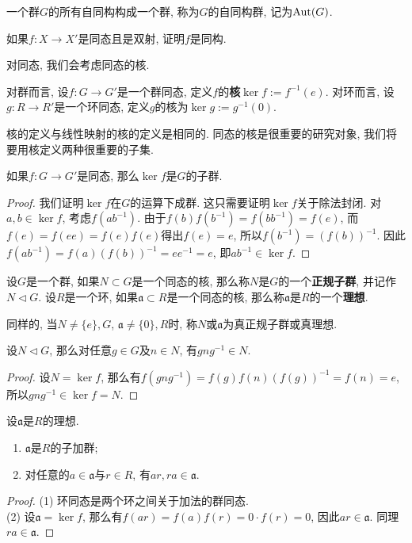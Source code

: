 \begin{defn}
    一个群$G$的所有自同构构成一个群, 称为$G$的自同构群, 记为$\operatorname{Aut}(G)$.
\end{defn}

\begin{ex}\label{inverse}
    如果$f:X\to X'$是同态且是双射, 证明$f$是同构.
\end{ex}

对同态, 我们会考虑同态的核.

\begin{defn}
    对群而言, 设$f:G\to G'$是一个群同态, 定义$f$的\textbf{核}$\ker f:=f^{-1}(e)$.
    对环而言, 设$g:R\to R'$是一个环同态, 定义$g$的核为$\ker g:=g^{-1}(0)$.
\end{defn}

核的定义与线性映射的核的定义是相同的.
同态的核是很重要的研究对象, 我们将要用核定义两种很重要的子集.

\begin{lem}\label{ker is subgroup}
    如果$f:G\to G'$是同态, 那么$\ker f$是$G$的子群.
\end{lem}
\begin{proof}
    我们证明$\ker f$在$G$的运算下成群.
    这只需要证明$\ker f$关于除法封闭.
    对$a,b\in\ker f$, 考虑$f(ab^{-1})$.
    由于$f(b)f(b^{-1})=f(bb^{-1})=f(e)$, 而$f(e)=f(ee)=f(e)f(e)$得出$f(e)=e$, 所以$f(b^{-1})=(f(b))^{-1}$.
    因此$f(ab^{-1})=f(a)(f(b))^{-1}=ee^{-1}=e$, 即$ab^{-1}\in\ker f$.
\end{proof}

\begin{defn}
    设$G$是一个群, 如果$N\subset G$是一个同态的核, 那么称$N$是$G$的一个\textbf{正规子群}, 并记作$N\lhd G$.
    设$R$是一个环, 如果$\mathfrak{a}\subset R$是一个同态的核, 那么称$\mathfrak{a}$是$R$的一个\textbf{理想}.

    同样的, 当$N\neq\{e\},G$, $\mathfrak{a}\neq\{0\},R$时, 称$N$或$\mathfrak{a}$为真正规子群或真理想.
\end{defn}

\begin{prop}[正规子群的性质]
    设$N\lhd G$, 那么对任意$g\in G$及$n\in N$, 有$gng^{-1}\in N$.
\end{prop}
\begin{proof}
    设$N=\ker f$, 那么有$f(gng^{-1})=f(g)f(n)(f(g))^{-1}=f(n)=e$, 所以$gng^{-1}\in\ker f=N$.
\end{proof}

\begin{prop}[理想的性质]\label{defn of ideal}
    设$\mathfrak{a}$是$R$的理想.
    \begin{enumerate}[\rm (1)]
        \item $\mathfrak{a}$是$R$的子加群;
        \item 对任意的$a\in\mathfrak{a}$与$r\in R$, 有$ar,ra\in\mathfrak{a}$.
    \end{enumerate}
\end{prop}
\begin{proof}
    (1) 环同态是两个环之间关于加法的群同态.\\
    (2) 设$\mathfrak{a}=\ker f$, 那么有$f(ar)=f(a)f(r)=0\cdot f(r)=0$, 因此$ar\in\mathfrak{a}$.
    同理$ra\in\mathfrak{a}$.
\end{proof}

